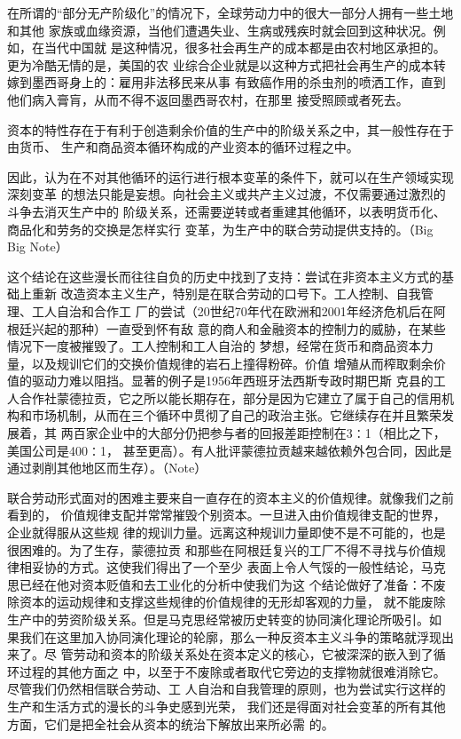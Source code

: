 在所谓的“部分无产阶级化”的情况下，全球劳动力中的很大一部分人拥有一些土地和其他
家族或血缘资源，当他们遭遇失业、生病或残疾时就会回到这种状况。例如，在当代中国就
是这种情况，很多社会再生产的成本都是由农村地区承担的。更为冷酷无情的是，美国的农
业综合企业就是以这种方式把社会再生产的成本转嫁到墨西哥身上的：雇用非法移民来从事
有致癌作用的杀虫剂的喷洒工作，直到他们病入膏肓，从而不得不返回墨西哥农村，在那里
接受照顾或者死去。

资本的特性存在于有利于创造剩余价值的生产中的阶级关系之中，其一般性存在于由货币、
生产和商品资本循环构成的产业资本的循环过程之中。

因此，认为在不对其他循环的运行进行根本变革的条件下，就可以在生产领域实现深刻变革
的想法只能是妄想。向社会主义或共产主义过渡，不仅需要通过激烈的斗争去消灭生产中的
阶级关系，还需要逆转或者重建其他循环，以表明货币化、商品化和劳务的交换是怎样实行
变革，为生产中的联合劳动提供支持的。（Big Big Note）

这个结论在这些漫长而往往自负的历史中找到了支持：尝试在非资本主义方式的基础上重新
改造资本主义生产，特别是在联合劳动的口号下。工人控制、自我管理、工人自治和合作工
厂的尝试（20世纪70年代在欧洲和2001年经济危机后在阿根廷兴起的那种）一直受到怀有敌
意的商人和金融资本的控制力的威胁，在某些情况下一度被摧毁了。工人控制和工人自治的
梦想，经常在货币和商品资本力量，以及规训它们的交换价值规律的岩石上撞得粉碎。价值
增殖从而榨取剩余价值的驱动力难以阻挡。显著的例子是1956年西班牙法西斯专政时期巴斯
克县的工人合作社蒙德拉贡，它之所以能长期存在，部分是因为它建立了属于自己的信用机
构和市场机制，从而在三个循环中贯彻了自己的政治主张。它继续存在并且繁荣发展着，其
两百家企业中的大部分仍把参与者的回报差距控制在3∶1（相比之下，美国公司是400∶1，
甚至更高）。有人批评蒙德拉贡越来越依赖外包合同，因此是通过剥削其他地区而生存）。（Note）

联合劳动形式面对的困难主要来自一直存在的资本主义的价值规律。就像我们之前看到的，
价值规律支配并常常摧毁个别资本。一旦进入由价值规律支配的世界，企业就得服从这些规
律的规训力量。远离这种规训力量即使不是不可能的，也是很困难的。为了生存，蒙德拉贡
和那些在阿根廷复兴的工厂不得不寻找与价值规律相妥协的方式。这使我们得出了一个至少
表面上令人气馁的一般性结论，马克思已经在他对资本贬值和去工业化的分析中使我们为这
个结论做好了准备：不废除资本的运动规律和支撑这些规律的价值规律的无形却客观的力量，
就不能废除生产中的劳资阶级关系。但是马克思经常被历史转变的协同演化理论所吸引。如
果我们在这里加入协同演化理论的轮廓，那么一种反资本主义斗争的策略就浮现出来了。尽
管劳动和资本的阶级关系处在资本定义的核心，它被深深的嵌入到了循环过程的其他方面之
中，以至于不废除或者取代它旁边的支撑物就很难消除它。尽管我们仍然相信联合劳动、工
人自治和自我管理的原则，也为尝试实行这样的生产和生活方式的漫长的斗争史感到光荣，
我们还是得面对社会变革的所有其他方面，它们是把全社会从资本的统治下解放出来所必需
的。

